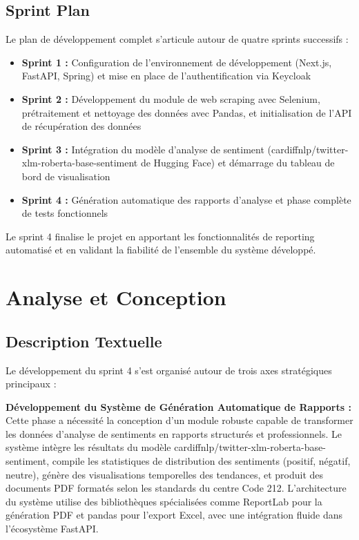 \subsection{Sprint Plan}

Le plan de développement complet s'articule autour de quatre sprints successifs :

\begin{itemize}
    \item \textbf{Sprint 1 :} Configuration de l'environnement de développement (Next.js, FastAPI, Spring) et mise en place de l'authentification via Keycloak
    \item \textbf{Sprint 2 :} Développement du module de web scraping avec Selenium, prétraitement et nettoyage des données avec Pandas, et initialisation de l'API de récupération des données
    \item \textbf{Sprint 3 :} Intégration du modèle d'analyse de sentiment (cardiffnlp/twitter-xlm-roberta-base-sentiment de Hugging Face) et démarrage du tableau de bord de visualisation
    \item \textbf{Sprint 4 :} Génération automatique des rapports d'analyse et phase complète de tests fonctionnels
\end{itemize}

Le sprint 4 finalise le projet en apportant les fonctionnalités de reporting automatisé et en validant la fiabilité de l'ensemble du système développé.

\section{Analyse et Conception}

\subsection{Description Textuelle}

Le développement du sprint 4 s'est organisé autour de trois axes stratégiques principaux :

\textbf{Développement du Système de Génération Automatique de Rapports :} Cette phase a nécessité la conception d'un module robuste capable de transformer les données d'analyse de sentiments en rapports structurés et professionnels. Le système intègre les résultats du modèle cardiffnlp/twitter-xlm-roberta-base-sentiment, compile les statistiques de distribution des sentiments (positif, négatif, neutre), génère des visualisations temporelles des tendances, et produit des documents PDF formatés selon les standards du centre Code 212. L'architecture du système utilise des bibliothèques spécialisées comme ReportLab pour la génération PDF et pandas pour l'export Excel, avec une intégration fluide dans l'écosystème FastAPI.

